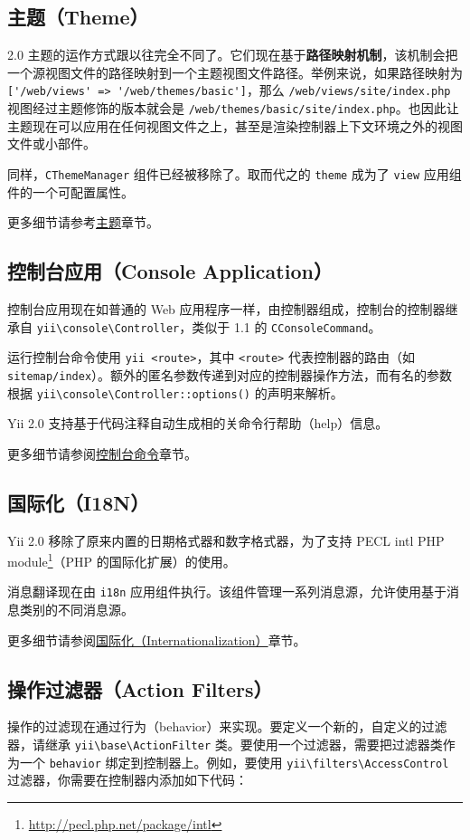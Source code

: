 \subsection{主题（Theme）}
2.0 主题的运作方式跟以往完全不同了。它们现在基于\textbf{路径映射机制}，该机制会把一个源视图文件的路径映射到一个主题视图文件路径。举例来说，如果路径映射为 \lstinline|['/web/views' => '/web/themes/basic']|，那么 \lstinline|/web/views/site/index.php| 视图经过主题修饰的版本就会是 \lstinline|/web/themes/basic/site/index.php|。也因此让主题现在可以应用在任何视图文件之上，甚至是渲染控制器上下文环境之外的视图文件或小部件。

同样，\lstinline|CThemeManager| 组件已经被移除了。取而代之的 \lstinline|theme| 成为了 \lstinline|view| 应用组件的一个可配置属性。

更多细节请参考\hyperref[output-theming.md]{主题}章节。

\subsection{控制台应用（Console Application）}
控制台应用现在如普通的 Web 应用程序一样，由控制器组成，控制台的控制器继承自 \texttt{yii{\allowbreak{}\textbackslash}console{\allowbreak{}\textbackslash}Controller}，类似于 1.1 的 \lstinline|CConsoleCommand|。

运行控制台命令使用 \lstinline|yii <route>|，其中 \lstinline|<route>| 代表控制器的路由（如 \lstinline|sitemap/index|）。额外的匿名参数传递到对应的控制器操作方法，而有名的参数根据 \texttt{yii{\allowbreak{}\textbackslash}console{\allowbreak{}\textbackslash}Controller\allowbreak{}::\allowbreak{}options()} 的声明来解析。

Yii 2.0 支持基于代码注释自动生成相的关命令行帮助（help）信息。

更多细节请参阅\hyperref[tutorial-console.md]{控制台命令}章节。

\subsection{国际化（I18N）}
Yii 2.0 移除了原来内置的日期格式器和数字格式器，为了支持 PECL intl PHP module\footnote{\url{http://pecl.php.net/package/intl}}（PHP 的国际化扩展）的使用。

消息翻译现在由 \lstinline|i18n| 应用组件执行。该组件管理一系列消息源，允许使用基于消息类别的不同消息源。

更多细节请参阅\hyperref[tutorial-i18n.md]{国际化（Internationalization）}章节。

\subsection{操作过滤器（Action Filters）}
操作的过滤现在通过行为（behavior）来实现。要定义一个新的，自定义的过滤器，请继承 \texttt{yii{\allowbreak{}\textbackslash}base{\allowbreak{}\textbackslash}ActionFilter} 类。要使用一个过滤器，需要把过滤器类作为一个 \lstinline|behavior| 绑定到控制器上。例如，要使用 \texttt{yii{\allowbreak{}\textbackslash}filters{\allowbreak{}\textbackslash}AccessControl} 过滤器，你需要在控制器内添加如下代码：

